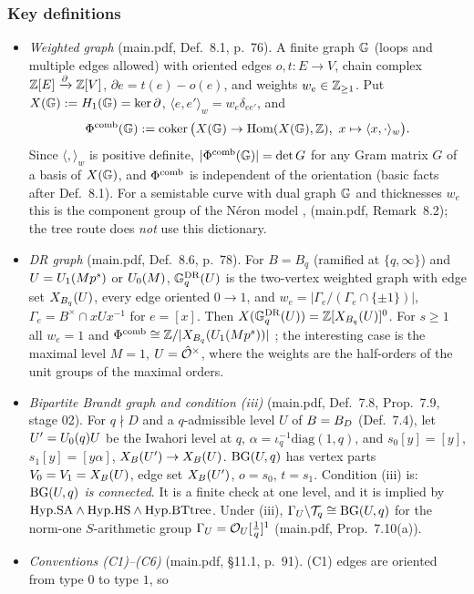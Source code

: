 \subsubsection*{Key definitions}
\begin{itemize}
\item \emph{Weighted graph} (main.pdf, Def.~8.1, p.~76). A finite graph $\mathbb{G}$ (loops and multiple edges allowed) with oriented edges
  $o,t:E\to V$, chain complex $\mathbb{Z}[E]\xrightarrow{\partial}\mathbb{Z}[V]$, $\partial e=t(e)-o(e)$, and weights $w_e\in\mathbb{Z}_{\ge1}$. Put
  $X(\mathbb{G}):=H_1(\mathbb{G})=\ker\partial$, $\langle e,e'\rangle_w=w_e\delta_{ee'}$, and
  \[\Phicomb(\G):=\coker\big(X(\G)\to\Hom(X(\G),\Z),\ x\mapsto\langle x,\cdot\rangle_w\big).\]
  Since $\langle,\rangle_w$ is positive definite, $|\Phi^{\mathrm{comb}}(\mathbb{G})|=\det G$ for any Gram matrix $G$ of a basis of $X(\mathbb{G})$, and
  $\Phi^{\mathrm{comb}}$ is independent of the orientation \stproved{} (basic facts after Def.~8.1). For a semistable curve with dual graph $\mathbb{G}$ and
  thicknesses $w_e$ this is the component group of the N\'eron model \cite[IX]{SGA7}, \cite[Prop.~2.2, Thm.~2.3, p.~436]{Ri90}
  \stcited{} (main.pdf, Remark~8.2); the tree route does \emph{not} use this dictionary.
\item \emph{DR graph} (main.pdf, Def.~8.6, p.~78). For $B=B_q$ (ramified at $\{q,\infty\}$) and $U=U_1(Mp^s)$ or $U_0(M)$,
  $\mathbb{G}^{\mathrm{DR}}_q(U)$ is the two-vertex weighted graph with edge set $X_{B_q}(U)$, every edge oriented $0\to1$, and
  $w_e=|\Gamma_e/(\Gamma_e\cap\{\pm1\})|$, $\Gamma_e=B^\times\cap xUx^{-1}$ for $e=[x]$. Then $X(\mathbb{G}^{\mathrm{DR}}_q(U))=\mathbb{Z}[X_{B_q}(U)]^0$.
  For $s\ge1$ all $w_e=1$ and $\Phi^{\mathrm{comb}}\cong\mathbb{Z}/|X_{B_q}(U_1(Mp^s))|$ \stproved{}; the interesting case is the maximal level $M=1$,
  $U=\hat{\mathcal{O}}^\times$, where the weights are the half-orders of the unit groups of the maximal orders.
\item \emph{Bipartite Brandt graph and condition (iii)} (main.pdf, Def.~7.8, Prop.~7.9, stage 02). For $q\nmid D$ and a $q$-admissible
  level $U$ of $B=B_D$ (Def.~7.4), let $U'=U_0(q)U$ be the Iwahori level at $q$, $\alpha=\iota_q^{-1}\mathrm{diag}(1,q)$, and
  $s_0[y]=[y]$, $s_1[y]=[y\alpha]$, $X_B(U')\to X_B(U)$. $\mathrm{BG}(U,q)$ has vertex parts $V_0=V_1=X_B(U)$, edge set $X_B(U')$, $o=s_0$, $t=s_1$.
  Condition (iii) is: \emph{$\mathrm{BG}(U,q)$ is connected}. It is a finite check at one level, and it is implied by
  $\mathrm{Hyp.SA}\wedge\mathrm{Hyp.HS}\wedge\mathrm{Hyp.BTtree}$. Under (iii), $\Gamma_U\backslash\mathcal{T}_q\cong\mathrm{BG}(U,q)$ for the norm-one $S$-arithmetic group
  $\Gamma_U=\mathcal{O}_U[\frac1q]^1$ (main.pdf, Prop.~7.10(a)).
\item \emph{Conventions (C1)--(C6)} (main.pdf, \S11.1, p.~91). (C1) edges are oriented from type $0$ to type $1$, so

\end{itemize}
